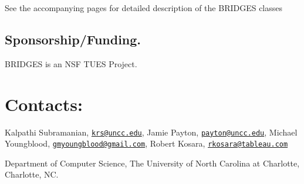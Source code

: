 See the accompanying pages for detailed description of the B\+R\+I\+D\+G\+E\+S classes \hypertarget{index_sponsor_sec}{}\subsection{Sponsorship/\+Funding.}\label{index_sponsor_sec}
B\+R\+I\+D\+G\+E\+S is an N\+S\+F T\+U\+E\+S Project.\hypertarget{index_contacts_sec}{}\section{Contacts\+:}\label{index_contacts_sec}
Kalpathi Subramanian, \href{mailto:krs@uncc.edu}{\tt krs@uncc.\+edu}, Jamie Payton, \href{mailto:payton@uncc.edu}{\tt payton@uncc.\+edu}, Michael Youngblood, \href{mailto:gmyoungblood@gmail.com}{\tt gmyoungblood@gmail.\+com}, Robert Kosara, \href{mailto:rkosara@tableau.com}{\tt rkosara@tableau.\+com}

Department of Computer Science, The University of North Carolina at Charlotte, Charlotte, N\+C. 
